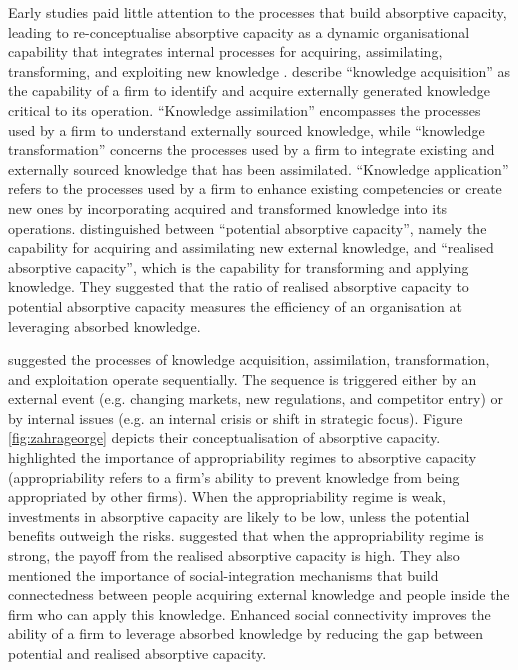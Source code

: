Early studies paid little attention to the processes that build absorptive capacity, leading \citet{zahra2002absorptive} to re-conceptualise absorptive capacity as a dynamic organisational capability that integrates internal processes for acquiring, assimilating, transforming, and exploiting new knowledge \citep{easterby2008absorptive,omidvar2013revisiting}. \cite{zahra2002absorptive} describe \enquote{knowledge acquisition} as the capability of a firm to identify and acquire externally generated knowledge critical to its operation. \enquote{Knowledge assimilation} encompasses the processes used by a firm to understand externally sourced knowledge, while \enquote{knowledge transformation} concerns the processes used by a firm to integrate existing and externally sourced knowledge that has been assimilated. \enquote{Knowledge application} refers to the processes used by a firm to enhance existing competencies or create new ones by incorporating acquired and transformed knowledge into its operations. \citet{zahra2002absorptive} distinguished between \enquote{potential absorptive capacity}, namely the capability for acquiring and assimilating new external knowledge, and \enquote{realised absorptive capacity}, which is the capability for transforming and applying knowledge. They suggested that the ratio of realised absorptive capacity to potential absorptive capacity measures the efficiency of an organisation at leveraging absorbed knowledge.\medskip 

\citet{zahra2002absorptive} suggested the processes of knowledge acquisition, assimilation, transformation, and exploitation operate sequentially. The sequence is triggered either by an external event (e.g. changing markets, new regulations, and competitor entry) or by internal issues (e.g. an internal crisis or shift in strategic focus). Figure \ref{fig:zahrageorge} depicts their conceptualisation of absorptive capacity. \citet{zahra2002absorptive} highlighted the importance of appropriability regimes to absorptive capacity (appropriability refers to a firm's ability to prevent knowledge from being appropriated by other firms). When the appropriability regime is weak, investments in absorptive capacity are likely to be low, unless the potential benefits outweigh the risks. \citet{zahra2002absorptive} suggested that when the appropriability regime is strong, the payoff from the realised absorptive capacity is high. They also mentioned the importance of social-integration mechanisms that build connectedness between people acquiring external knowledge and people inside the firm who can apply this knowledge. Enhanced social connectivity improves the ability of a firm to leverage absorbed knowledge by reducing the gap between potential and realised absorptive capacity. \medskip 

